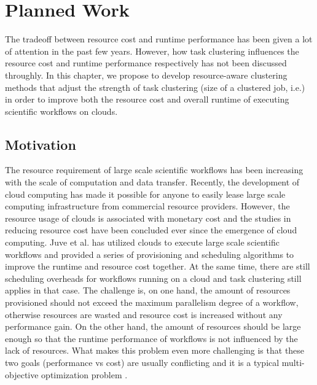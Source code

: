 \chapter{Planned Work}

The tradeoff between resource cost and runtime performance has been given a lot of attention in the past few years. However, how task clustering influences the resource cost and runtime performance respectively has not been discussed throughly. In this chapter, we propose to develop resource-aware clustering methods that adjust the strength of task clustering (size of a clustered job, i.e.) in order to improve both the resource cost and overall runtime of executing scientific workflows on clouds. 

\section{Motivation}

The resource requirement of large scale scientific workflows has been increasing with the scale of computation and data transfer. 
Recently, the development of cloud computing \cite{Hoffa2008, AmazonAWS} has made it possible for anyone to easily lease large scale computing infrastructure from commercial resource providers. However, the resource usage of clouds is associated with monetary cost and the studies in reducing resource cost have been concluded ever since the emergence of cloud computing. Juve \cite{Juve2008} et al. has utilized clouds to execute large scale scientific workflows and provided a series of provisioning and scheduling algorithms to improve the runtime and resource cost together. At the same time, there are still scheduling overheads for workflows running on a cloud and task clustering still applies in that case. 
The challenge is, on one hand, the amount of resources provisioned should not exceed the maximum parallelism degree of a workflow, otherwise resources are wasted and resource cost is increased without any performance gain. On the other hand, the amount of resources should be large enough so that the runtime performance of workflows is not influenced by the lack of resources. What makes this problem even more challenging is that these two goals (performance vs cost) are usually conflicting and it is a typical multi-objective optimization problem \cite{Talukder2009, Wieczorek2009}. 

